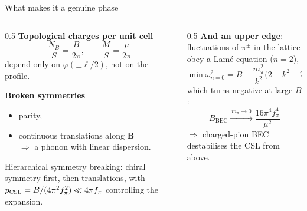 \documentclass[aspectratio=169,10pt]{beamer}
\newcommand{\B}{\bm{B}}
\newcommand{\fpi}{f_\pi}
\newcommand{\mpi}{m_\pi}
\newcommand{\Bbec}{B_{\mathrm{BEC}}}
\begin{document}
\begin{frame}{What makes it a genuine phase}
\begin{columns}[T,onlytextwidth]
\begin{column}{0.5\textwidth}
\textbf{Topological charges per unit cell}
\[
 \frac{N_B}{S}=\frac{B}{2\pi},\qquad \frac{M}{S}=\frac{\mu}{2\pi}
\]
depend only on $\varphi(\pm\ell/2)$, not on the profile.
\vspace{3mm}

\textbf{Broken symmetries}
\begin{itemize}
  \item parity,
  \item continuous translations along $\B$ \\
        $\Rightarrow$ a \alert{phonon} with linear dispersion.
\end{itemize}
\vspace{2mm}
{\small Hierarchical symmetry breaking: chiral symmetry first, then
translations, with $p_{\rm CSL}=B/(4\pi^2\fpi^2)\ll4\pi\fpi$ controlling the
expansion.}
\end{column}
\begin{column}{0.5\textwidth}
\textbf{And an upper edge}: fluctuations of $\pi^\pm$ in the lattice obey a
Lam\'e equation ($n=2$),
\[
 \min\omega^2_{n=0}
 =B-\frac{\mpi^2}{k^2}\Big(2-k^2+2\sqrt{1-k^2+k^4}\Big)
\]
which turns negative at large $B$:
\[
 \Bbec\xrightarrow{\ \mpi\to0\ }\frac{16\pi^4\fpi^4}{\mu^2}
\]
$\Rightarrow$ charged-pion BEC destabilises the CSL from above.
\end{column}
\end{columns}
\end{frame}
\end{document}
